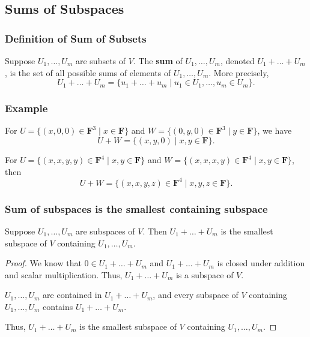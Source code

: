\documentclass[11pt]{article}
\begin{document}
    \subsection{Sums of Subspaces}

    \subsubsection{Definition of Sum of Subsets}

    Suppose \(U_1, \dots, U_m\) are subsets of $V$. The \textbf{sum} of \(U_1, \dots, U_m\), denoted \(U_1 + \dots + U_m\), is the set of all possible sums of elements of \(U_1, \dots, U_m\). More precisely, \[U_1 + \dots + U_m = \{u_1 + \dots + u_m \mid u_1 \in U_1, \dots, u_m \in U_m\}.\]

    \subsubsection{Example}

    For \(U = \{(x,0,0) \in \textbf{F}^3 \mid x \in \textbf{F}\}\) and \(W = \{(0,y,0) \in \textbf{F}^3 \mid y \in \textbf{F}\}\), we have \[U + W = \{(x,y,0) \mid x,y \in \textbf{F}\}.\]

    For \(U = \{(x,x,y,y) \in \textbf{F}^4 \mid x,y \in \textbf{F}\}\) and \(W = \{(x,x,x,y) \in \textbf{F}^4 \mid x,y \in \textbf{F}\}\), then \[U + W = \{(x,x,y,z) \in \textbf{F}^4 \mid x,y,z \in \textbf{F}\}.\]

    \subsubsection{Sum of subspaces is the smallest containing subspace}

    Suppose \(U_1, \dots, U_m\) are subspaces of $V$. Then \(U_1 + \dots + U_m\) is the smallest subspace of $V$ containing \(U_1, \dots, U_m\).

    \begin{proof}
        We know that \(0 \in U_1 + \dots + U_m\) and \( U_1 + \dots + U_m \) is closed under addition and scalar multiplication. Thus, \(U_1 + \dots + U_m\) is a subspace of $V$.

        \(U_1, \dots, U_m\) are contained in \(U_1 + \dots + U_m\), and every subspace of $V$ containing \(U_1, \dots, U_m\) contains \(U_1 + \dots + U_m\).

        Thus, \(U_1 + \dots + U_m\) is the smallest subspace of $V$ containing \(U_1, \dots, U_m\).
    \end{proof}
\end{document}
